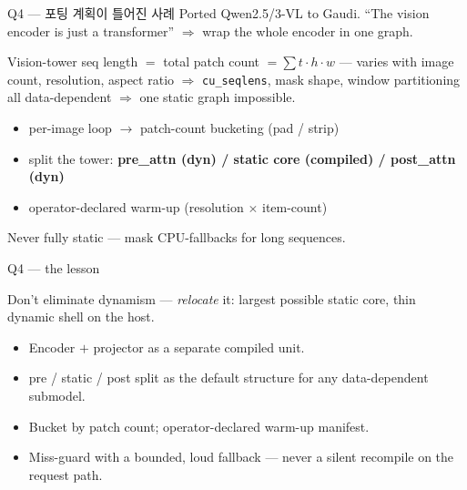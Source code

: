 \begin{frame}{Q4 — 포팅 계획이 틀어진 사례}
  Ported Qwen2.5/3-VL to Gaudi. ``The vision encoder is just a transformer''
  $\Rightarrow$ wrap the whole encoder in one graph.

  Vision-tower seq length $=$ total patch count $=\sum t\cdot h\cdot w$ — varies with image
  count, resolution, aspect ratio $\Rightarrow$ \texttt{cu\_seqlens}, mask shape, window
  partitioning all data-dependent $\Rightarrow$ one static graph impossible.

  \begin{itemize}
    \item per-image loop $\to$ patch-count bucketing (pad / strip)
    \item split the tower: \textbf{pre\_attn (dyn) / static core (compiled) / post\_attn (dyn)}
    \item operator-declared warm-up (resolution $\times$ item-count)
  \end{itemize}
  Never fully static — mask CPU-fallbacks for long sequences.
\end{frame}

\begin{frame}{Q4 — the lesson}
  \begin{alertblock}{}
    Don't eliminate dynamism — \emph{relocate} it: largest possible static core,
    thin dynamic shell on the host.
  \end{alertblock}
  \begin{itemize}\setlength\itemsep{4pt}
    \item Encoder $+$ projector as a separate compiled unit.
    \item pre / static / post split as the default structure for any data-dependent submodel.
    \item Bucket by patch count; operator-declared warm-up manifest.
    \item Miss-guard with a bounded, loud fallback — never a silent recompile on the request path.
  \end{itemize}
\end{frame}
